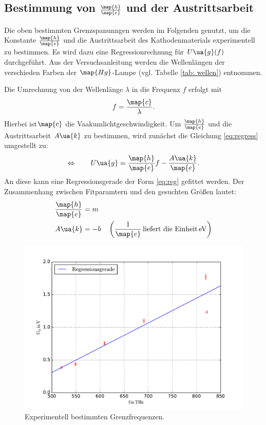 \subsection{Bestimmung von $\frac{\map{h}}{\map{e}}$ und der Austrittsarbeit}
\FloatBarrier
Die oben bestimmten Grenzspanunngen werden im %
Folgenden genutzt, um die Konstante $\frac{\map{h}}{\map{e}}$ und die Austrittsarbeit des Kathodenmaterials
experimentell zu bestimmen.
Es wird dazu eine Regressionrechnung für $U\ua{g}(f)$ durchgeführt.
Aus der Versuchsanleitung\cite{anleitung500} werden die Wellenlängen der verschieden Farben der $\map{Hg}$-Lampe (vgl. Tabelle \ref{tab: wellen})
entnommen.

Die Umrechnung von der Wellenlänge $\lambda$ in die Frequenz $f$ erfolgt mit
\begin{equation*}
  \label{eq:umrech}
  f=\frac{\map{c}}{\lambda}.
\end{equation*}
Hierbei ist$\map{c}$ die Vaakumlichtgeschwindigkeit\cite{scipy}. %
Um $\frac{\map{h}}{\map{e}}$ und die Austrittsarbeit $A\ua{k}$ zu bestimmen, wird zunächst die
Gleichung \eqref{eq:regress} umgestellt zu:
\begin{equation*}
  \Leftrightarrow \qquad U\ua{g}=\frac{\map{h}}{\map{e}} f - \frac{A\ua{k}}{\map{e}}.
\end{equation*}
An diese kann eine Regressionsgerade der Form \eqref{eq:reg} gefittet werden.
Der Zusammenhang zwischen Fitparamtern und den gesuchten Größen lautet:
\begin{align*}
  \frac{\map{h}}{\map{e}}&=m\\
  A\ua{k}&=-b \quad \left(\frac{1}{\map{e}}\,\text{liefert die Einheit} \, \si{\eV}\right)
\end{align*}
\begin{figure}
    \centering
    \includegraphics[width=1 \textwidth]{../Messdaten/wellenlaenge_gegen.pdf}
    \caption{Experimentell bestimmten Grenzfrequenzen.}
    \label{fig:grenz}
  \end{figure}
